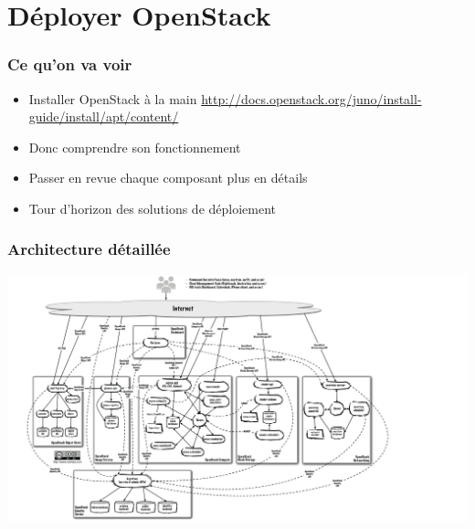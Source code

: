   \section{Déployer OpenStack}

  \begin{frame}
    \frametitle{Ce qu'on va voir}
    \begin{itemize}
      \item Installer OpenStack à la main \url{http://docs.openstack.org/juno/install-guide/install/apt/content/}
      \item Donc comprendre son fonctionnement
      \item Passer en revue chaque composant plus en détails
      \item Tour d'horizon des solutions de déploiement
    \end{itemize}
  \end{frame}

  \begin{frame}
    \frametitle{Architecture détaillée}
    \begin{center}
      \includegraphics[width=\textwidth]{images/architecture.jpg}
    \end{center}
  \end{frame}

